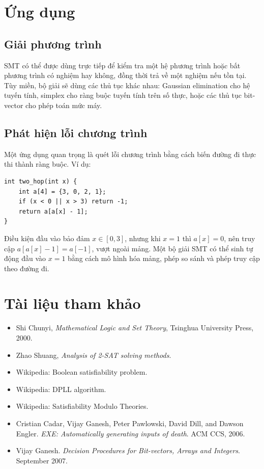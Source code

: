 \documentclass[11pt]{article}
\begin{document}
\section{Ứng dụng}

\subsection{Giải phương trình}

SMT có thể được dùng trực tiếp để kiểm tra một hệ phương trình hoặc bất
phương trình có nghiệm hay không, đồng thời trả về một nghiệm nếu tồn tại.
Tùy miền, bộ giải sẽ dùng các thủ tục khác nhau: Gaussian elimination cho hệ
tuyến tính, simplex cho ràng buộc tuyến tính trên số thực, hoặc các thủ tục
bit-vector cho phép toán mức máy.

\subsection{Phát hiện lỗi chương trình}

Một ứng dụng quan trọng là quét lỗi chương trình bằng cách biến đường đi thực
thi thành ràng buộc. Ví dụ:
\begin{verbatim}
int two_hop(int x) {
    int a[4] = {3, 0, 2, 1};
    if (x < 0 || x > 3) return -1;
    return a[a[x] - 1];
}
\end{verbatim}
Điều kiện đầu vào bảo đảm \(x\in[0,3]\), nhưng khi \(x=1\) thì
\(a[x]=0\), nên truy cập \(a[a[x]-1]=a[-1]\), vượt ngoài mảng. Một bộ giải SMT
có thể sinh tự động đầu vào \(x=1\) bằng cách mô hình hóa mảng, phép so sánh
và phép truy cập theo đường đi.

\section*{Tài liệu tham khảo}

\begin{itemize}
  \item Shi Chunyi, \textit{Mathematical Logic and Set Theory}, Tsinghua
  University Press, 2000.
  \item Zhao Shuang, \textit{Analysis of 2-SAT solving methods}.
  \item Wikipedia: Boolean satisfiability problem.
  \item Wikipedia: DPLL algorithm.
  \item Wikipedia: Satisfiability Modulo Theories.
  \item Cristian Cadar, Vijay Ganesh, Peter Pawlowski, David Dill, and Dawson
  Engler. \textit{EXE: Automatically generating inputs of death}. ACM CCS,
  2006.
  \item Vijay Ganesh. \textit{Decision Procedures for Bit-vectors, Arrays and
  Integers}. September 2007.
\end{itemize}
\end{document}
